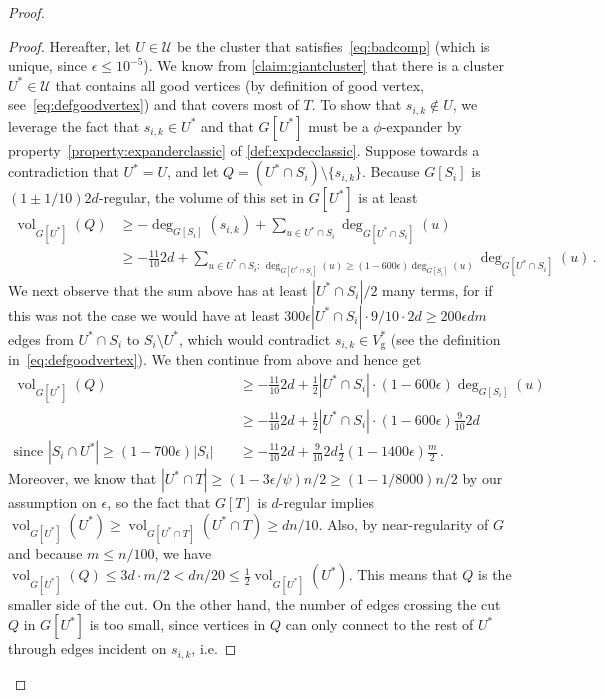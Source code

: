 \documentclass[epsfig,letter,11pt]{article}
\numberwithin{equation}{section}
\DeclareMathOperator{\vol}{vol}
\DeclareMathOperator*{\good}{g}
\begin{document}
\begin{proof}
\begin{proof}
	Hereafter, let $U \in \mathcal{U}$ be the cluster that satisfies~\eqref{eq:badcomp} (which is unique, since $\epsilon \le 10^{-5}$). We know from \cref{claim:giantcluster} that there is a cluster $U^* \in \mathcal{U}$ that contains all good vertices (by definition of good vertex, see~\eqref{eq:defgoodvertex}) and that covers most of $T$.	To show that $s_{i,k} \notin U$, we leverage the fact that $s_{i,k} \in U^*$ and that $G[U^*]$ must be a $\phi$-expander by property~\eqref{property:expanderclassic} of \cref{def:expdecclassic}. Suppose towards a contradiction that $U^* = U$, and let $Q = (U^* \cap S_i) \setminus \{s_{i,k}\}$. Because $G[S_i]$ is $(1 \pm 1/10)2d$-regular, the volume of this set in $G[U^*]$ is at least
	\begin{align*}
		\vol_{G[U^*]}(Q) & \ge -\deg_{G[S_i]}(s_{i,k}) + \sum_{u \in U^* \cap S_i} \deg_{G[U^* \cap S_i]}(u) \\
		& \ge  -\frac{11}{10}2d + \sum_{u \in U^* \cap S_i:\,\deg_{G[U^* \cap S_i]}(u) \ge (1-600{\epsilon}) \deg_{G[S_i]}(u)} \deg_{G[U^* \cap S_i]}(u) \, .
	\end{align*}
	We next observe that the sum above has at least $|U^* \cap S_i|/2$ many terms, for if this was not the case we would have at least $300\epsilon |U^* \cap S_i| \cdot 9/10 \cdot  2d \ge 200\epsilon dm$ edges from $U^* \cap S_i$ to $S_i \setminus U^*$, which would contradict $s_{i,k} \in V^*_{{\good}} $ (see the definition in~\eqref{eq:defgoodvertex}). We then continue from above and hence get
	\begin{align*}
		\vol_{G[U^*]}(Q) & \ge  -\frac{11}{10}2d + \frac{1}{2} |U^* \cap S_i|\cdot  \left(1-600{\epsilon}\right) \deg_{G[S_i]}(u)\\
		& \ge  -\frac{11}{10}2d + \frac{1}{2} |U^* \cap S_i|\cdot  \left(1-600{\epsilon}\right) \frac{9}{10} 2d\\
		\text{since $|S_i \cap U^*| \ge (1-700\epsilon) |S_i|$}\quad & \ge -\frac{11}{10}2d+\frac{9}{10}2d \frac{1}{2}\left(1-1400{\epsilon}\right) \frac{m}{2}\, .
	\end{align*}
	Moreover, we know that $|U^* \cap T| \ge (1-3\epsilon/\psi)n/2 \ge (1-1/8000)n/2$ by our assumption on $\epsilon$, so the fact that $G[T]$ is $d$-regular implies $\vol_{G[U^*]}(U^*) \ge \vol_{G[U^* \cap T]}(U^* \cap T) \ge dn/10$. Also, by near-regularity of $G$ and because $m \le n/100$, we have $\vol_{G[U^*]}(Q) \le 3d \cdot m/2 < dn/20 \le \frac{1}{2} \vol_{G[U^*]}(U^*)$. This means that $Q$ is the smaller side of the cut. On the other hand, the number of edges crossing the cut $Q$ in $G[U^*]$ is too small, since vertices in $Q$ can only connect to the rest of $U^*$ through edges incident on $s_{i,k}$, i.e.

\end{proof}
\end{proof}
\end{document}
